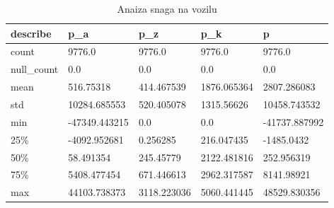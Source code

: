 \begin{table}[!ht]
    \centering
    \caption{Anaiza snaga na vozilu}
    \begin{tabular}{lllll}
    \hline
        \textbf{describe} & \textbf{p\_a} & \textbf{p\_z} & \textbf{p\_k} & \textbf{p} \\ \hline
        count & 9776.0 & 9776.0 & 9776.0 & 9776.0 \\ 
        null\_count & 0.0 & 0.0 & 0.0 & 0.0 \\ 
        mean & 516.75318 & 414.467539 & 1876.065364 & 2807.286083 \\ 
        std & 10284.685553 & 520.405078 & 1315.56626 & 10458.743532 \\ 
        min & -47349.443215 & 0.0 & 0.0 & -41737.887992 \\ 
        25\% & -4092.952681 & 0.256285 & 216.047435 & -1485.0432 \\ 
        50\% & 58.491354 & 245.45779 & 2122.481816 & 252.956319 \\ 
        75\% & 5408.477454 & 671.446613 & 2962.317587 & 8141.98921 \\ 
        max & 44103.738373 & 3118.223036 & 5060.441445 & 48529.830356 \\ \hline
    \end{tabular}
    \label{table:c:powers}
\end{table}